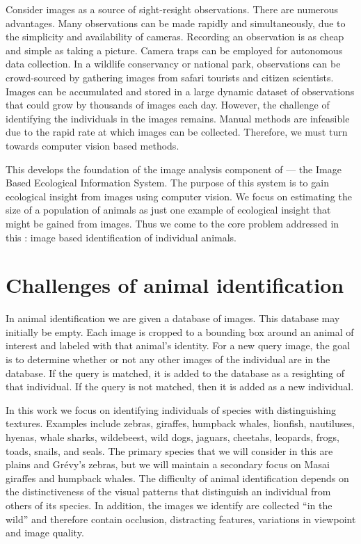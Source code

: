     Consider images as a source of sight-resight observations. There are numerous advantages. Many observations can
    be made rapidly and simultaneously, due to the simplicity and availability of cameras. Recording an observation
    is as cheap and simple as taking a picture. Camera traps can be employed for autonomous data collection. In a
    wildlife conservancy or national park, observations can be crowd-sourced by gathering images from safari
    tourists and citizen scientists. Images can be accumulated and stored in a large dynamic dataset of
    observations that could grow by thousands of images each day. However, the challenge of identifying the
    individuals in the images remains. Manual methods are infeasible due to the rapid rate at which images can be
    collected. Therefore, we must turn towards computer vision based methods.

    This \thesis{} develops the foundation of the image analysis component of \IBEIS{} --- the Image Based
    Ecological Information System. The purpose of this system is to gain ecological insight from images using
    computer vision. We focus on estimating the size of a population of animals as just one example of ecological
    insight that might be gained from images. Thus we come to the core problem addressed in this \thesis{}: image
    based identification of individual animals.

\section{Challenges of animal identification}\label{sec:challenges}

    In animal identification we are given a database of images. This database may initially be empty. Each image is
    cropped to a bounding box around an animal of interest and labeled with that animal's identity. For a new query
    image, the goal is to determine whether or not any other images of the individual are in the database. If the
    query is matched, it is added to the database as a resighting of that individual. If the query is not matched,
    then it is added as a new individual.

    In this work we focus on identifying individuals of species with distinguishing textures. Examples include
    zebras, giraffes, humpback whales, lionfish, nautiluses, hyenas, whale sharks, wildebeest, wild dogs, jaguars,
    cheetahs, leopards, frogs, toads, snails, and seals. The primary species that we will consider in this
    \thesis{} are plains and Grévy's zebras, but we will maintain a secondary focus on Masai giraffes and humpback
    whales. The difficulty of animal identification depends on the distinctiveness of the visual patterns that
    distinguish an individual from others of its species. In addition, the images we identify are collected ``in
    the wild'' and therefore contain occlusion, distracting features, variations in viewpoint and image quality.

